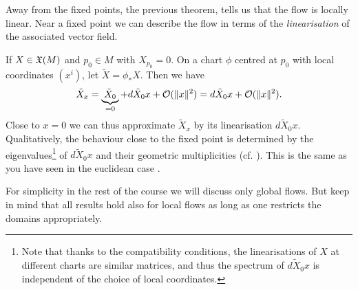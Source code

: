 \begin{remark}
  Away from the fixed points, the previous theorem, tells us that the flow is locally linear.
  Near a fixed point we can describe the flow in terms of the \emph{linearisation} of the associated vector field.

  If $X\in\mathfrak{X}(M)$ and $p_0\in M$ with $X_{p_0} = 0$. On a chart $\phi$ centred at $p_0$ with local coordinates $(x^i)$, let $\tilde X = \phi_* X$.
  Then we have
  \begin{equation}
    \tilde X_x = \underbrace{\tilde X_0}_{=0} + d\tilde X_0 x + \mathcal{O}(\|x\|^2) = d\tilde X_0 x + \mathcal{O}(\|x\|^2).
  \end{equation}
  Close to $x=0$ we can thus approximate $\tilde X_x$ by its linearisation $ d\tilde X_0 x$.
  Qualitatively, the behaviour close to the fixed point is determined by the eigenvalues\footnote{Note that thanks to the compatibility conditions, the linearisations of $X$ at different charts are similar matrices, and thus the spectrum of $d\tilde X_0 x$ is independent of the choice of local coordinates.} of $d\tilde X_0 x$ and their geometric multiplicities (cf. \cite[Figure 9.8]{book:lee}). This is the same as you have seen in the euclidean case \cite[Chapter 5.3]{book:knauf}.
\end{remark}

\begin{tcolorbox}
For simplicity in the rest of the course we will discuss only global flows.
But keep in mind that all results hold also for local flows as long as one restricts the domains appropriately.
\end{tcolorbox}